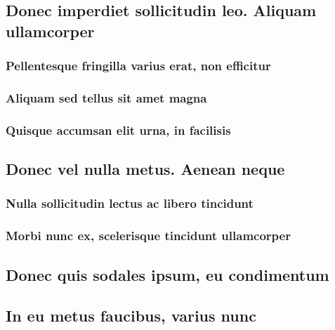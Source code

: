 \documentclass[%
  german,%
  exercise,%
  oneside,%
]{iswartcl}
\begin{document}
\lipsum[1-8]

\subsection{Donec imperdiet sollicitudin leo. Aliquam ullamcorper}

\lipsum[1-8]

\subsubsection{Pellentesque fringilla varius erat, non efficitur}

\lipsum[1-8]

\subsubsection{Aliquam sed tellus sit amet magna}

\lipsum[1-8]

\subsubsection{Quisque accumsan elit urna, in facilisis}

\lipsum[1-8]

\subsection{Donec vel nulla metus. Aenean neque}

\lipsum[1-8]

\subsubsection{Nulla sollicitudin lectus ac libero tincidunt}

\lipsum[1-8]

\subsubsection{Morbi nunc ex, scelerisque tincidunt ullamcorper}

\lipsum[1-8]

\subsection{Donec quis sodales ipsum, eu condimentum}

\lipsum[1-8]

\subsection{In eu metus faucibus, varius nunc}
\end{document}
